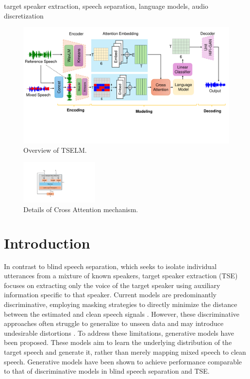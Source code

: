 \documentclass[conference]{IEEEtran}
\begin{document}
\begin{IEEEkeywords}
target speaker extraction, speech separation, language models, audio discretization
\end{IEEEkeywords}
\begin{figure}[t]
    \centering
    \includegraphics[width=\textwidth]{assets/model.pdf}
    \caption{Overview of TSELM.}
    \label{model}
    \end{figure}

    \begin{figure}
        \centering
        \includegraphics[width=0.35\textwidth]{assets/cross_attention.pdf}
        \caption{Details of Cross Attention mechanism.}
        \label{cross_attention}
        \end{figure}


        
\section{Introduction}

In contrast to blind speech separation, which seeks to isolate individual utterances from a mixture of known speakers, target speaker extraction (TSE) focuses on extracting only the voice of the target speaker using auxiliary information specific to that speaker. Current models are predominantly discriminative, employing masking strategies to directly minimize the distance between the estimated and clean speech signals \cite{luo2019conv,spex_plus,sepformer,sef_net}. However, these discriminative approaches often struggle to generalize to unseen data and may introduce undesirable distortions \cite{distortion}. To address these limitations, generative models have been proposed. These models aim to learn the underlying distribution of the target speech and generate it, rather than merely mapping mixed speech to clean speech. Generative models have been shown to achieve performance comparable to that of discriminative models \cite{target_diff,tokensplit} in blind speech separation and TSE.
\end{document}
